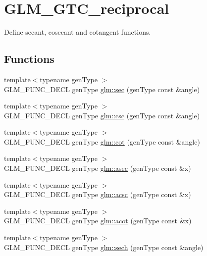\hypertarget{group__gtc__reciprocal}{\section{G\-L\-M\-\_\-\-G\-T\-C\-\_\-reciprocal}
\label{group__gtc__reciprocal}
}


Define secant, cosecant and cotangent functions.  


\subsection*{Functions}
\begin{DoxyCompactItemize}
\item 
{\footnotesize template$<$typename gen\-Type $>$ }\\G\-L\-M\-\_\-\-F\-U\-N\-C\-\_\-\-D\-E\-C\-L gen\-Type \hyperlink{group__gtc__reciprocal_gabb6829a472da1cc94d88afa6396bed1f}{glm\-::sec} (gen\-Type const \&angle)
\item 
{\footnotesize template$<$typename gen\-Type $>$ }\\G\-L\-M\-\_\-\-F\-U\-N\-C\-\_\-\-D\-E\-C\-L gen\-Type \hyperlink{group__gtc__reciprocal_ga5df75de99f63e854087a06f538907b2c}{glm\-::csc} (gen\-Type const \&angle)
\item 
{\footnotesize template$<$typename gen\-Type $>$ }\\G\-L\-M\-\_\-\-F\-U\-N\-C\-\_\-\-D\-E\-C\-L gen\-Type \hyperlink{group__gtc__reciprocal_ga2f49e28c2634ae1a212e2fc38c42ad42}{glm\-::cot} (gen\-Type const \&angle)
\item 
{\footnotesize template$<$typename gen\-Type $>$ }\\G\-L\-M\-\_\-\-F\-U\-N\-C\-\_\-\-D\-E\-C\-L gen\-Type \hyperlink{group__gtc__reciprocal_gac9761980e09149002a466ca131a4bcac}{glm\-::asec} (gen\-Type const \&x)
\item 
{\footnotesize template$<$typename gen\-Type $>$ }\\G\-L\-M\-\_\-\-F\-U\-N\-C\-\_\-\-D\-E\-C\-L gen\-Type \hyperlink{group__gtc__reciprocal_ga135e8f6b36bb85b5f7d8067e6b890e4d}{glm\-::acsc} (gen\-Type const \&x)
\item 
{\footnotesize template$<$typename gen\-Type $>$ }\\G\-L\-M\-\_\-\-F\-U\-N\-C\-\_\-\-D\-E\-C\-L gen\-Type \hyperlink{group__gtc__reciprocal_ga97d029f989f849b62915b068c264246b}{glm\-::acot} (gen\-Type const \&x)
\item 
{\footnotesize template$<$typename gen\-Type $>$ }\\G\-L\-M\-\_\-\-F\-U\-N\-C\-\_\-\-D\-E\-C\-L gen\-Type \hyperlink{group__gtc__reciprocal_gaaa698b992c63f454a3a1a1baa2773a3c}{glm\-::sech} (gen\-Type const \&angle)

\end{DoxyCompactItemize}
